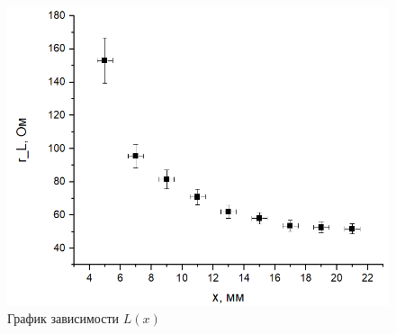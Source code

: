 \documentclass[a4paper, fontsize = 14pt]{article}
\begin{document}
\begin{figure}
	\centering
	\includegraphics[scale=0.6]{lab48ris3.png}
	\caption{График зависимости $L(x)$}
\end{figure}
\end{document}

